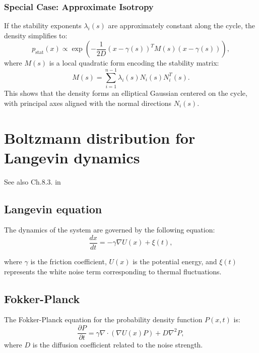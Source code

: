 \documentclass{article}
\theoremstyle{definition} \newtheorem{definition}{Definition}
\theoremstyle{remark} \newtheorem{remark}{Remark}
\newcounter{ct}
\begin{document}
\subsubsection{Special Case: Approximate Isotropy}
If the stability exponents $\lambda_i(s)$ are approximately constant along the cycle, the density simplifies to:
\begin{equation}
    p_{\text{stat}}(x) \propto \exp \left( - \frac{1}{2D} (x - \gamma(s))^T M(s) (x - \gamma(s)) \right),
\end{equation}
where $M(s)$ is a local quadratic form encoding the stability matrix:
\begin{equation}
    M(s) = \sum_{i=1}^{n-1} \lambda_i(s) N_i(s) N_i^T(s).
\end{equation}
This shows that the density forms an elliptical Gaussian centered on the cycle, with principal axes aligned with the normal directions $N_i(s)$.


\newpage




\newpage
\appendix

\section{Boltzmann distribution for Langevin dynamics}
See also Ch.8.3. in \citep{villani2021topics}
\subsection{Langevin equation}
The dynamics of the system are governed by the following equation:
\begin{equation}
    \frac{dx}{dt} = - \gamma \nabla U(x) + \xi(t),
\end{equation}

where $\gamma$ is the friction coefficient, $U(x)$ is the potential energy, and $\xi(t)$ represents the white noise term corresponding to thermal fluctuations.

\subsection{Fokker-Planck}
The Fokker-Planck equation for the probability density function $P(x,t)$ is:
\begin{equation}
    \frac{\partial P}{\partial t} = \gamma \nabla \cdot \left( \nabla U(x) P \right) + D \nabla^2 P,
\end{equation}
where $D$ is the diffusion coefficient related to the noise strength.
\end{document}
